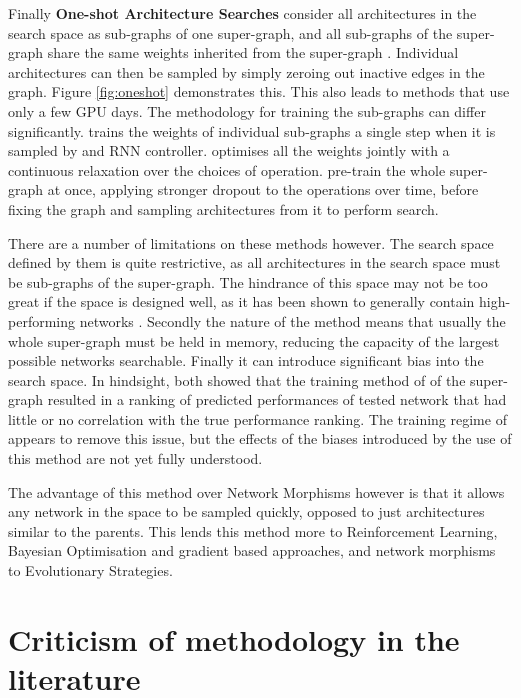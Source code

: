 Finally \textbf{One-shot Architecture Searches} consider all architectures in the search space as sub-graphs of one super-graph, and all sub-graphs of the super-graph share the same weights inherited from the super-graph \citep{Brock2017,Pham2018,liu2018darts,Bender2018,Cai2018,Xie2018}. Individual architectures can then be sampled by simply zeroing out inactive edges in the graph. Figure \ref{fig:oneshot} demonstrates this. This also leads to methods that use only a few GPU days. The methodology for training the sub-graphs can differ significantly. \citet{Pham2018} trains the weights of individual sub-graphs a single step when it is sampled by and RNN controller. \citet{liu2018darts} optimises all the weights jointly with a continuous relaxation over the choices of operation. \citet{Bender2018} pre-train the whole super-graph at once, applying stronger dropout to the operations over time, before fixing the graph and sampling architectures from it to perform search.

There are a number of limitations on these methods however. The search space defined by them is quite restrictive, as all architectures in the search space must be sub-graphs of the super-graph. The hindrance of this space may not be too great if the space is designed well, as it has been shown to generally contain high-performing networks \citep{Bender2018}. Secondly the nature of the method means that usually the whole super-graph must be held in memory, reducing the capacity of the largest possible networks searchable. Finally it can introduce significant bias into the search space. In hindsight, both \citet{Li, Sciuto} showed that the training method of \citet{Pham2018} of the super-graph resulted in a ranking of predicted performances of tested network that had little or no correlation with the true performance ranking. The training regime of \citet{Bender2018} appears to remove this issue, but the effects of the biases introduced by the use of this method are not yet fully understood. 

The advantage of this method over Network Morphisms however is that it allows any network in the space to be sampled quickly, opposed to just architectures similar to the parents. This lends this method more to Reinforcement Learning, Bayesian Optimisation and gradient based approaches, and network morphisms to Evolutionary Strategies.

\section{Criticism of methodology in the literature}

